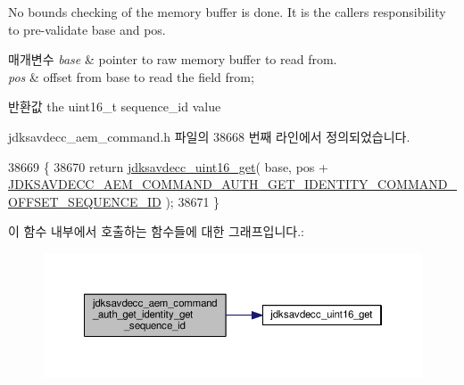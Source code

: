 No bounds checking of the memory buffer is done. It is the caller\textquotesingle{}s responsibility to pre-\/validate base and pos.


\begin{DoxyParams}{매개변수}
{\em base} & pointer to raw memory buffer to read from. \\
\hline
{\em pos} & offset from base to read the field from; \\
\hline
\end{DoxyParams}
\begin{DoxyReturn}{반환값}
the uint16\+\_\+t sequence\+\_\+id value 
\end{DoxyReturn}


jdksavdecc\+\_\+aem\+\_\+command.\+h 파일의 38668 번째 라인에서 정의되었습니다.


\begin{DoxyCode}
38669 \{
38670     \textcolor{keywordflow}{return} \hyperlink{group__endian_ga3fbbbc20be954aa61e039872965b0dc9}{jdksavdecc\_uint16\_get}( base, pos + 
      \hyperlink{group__command__auth__get__identity_gaadde34827077806c428cf6ead34ceae6}{JDKSAVDECC\_AEM\_COMMAND\_AUTH\_GET\_IDENTITY\_COMMAND\_OFFSET\_SEQUENCE\_ID}
       );
38671 \}
\end{DoxyCode}


이 함수 내부에서 호출하는 함수들에 대한 그래프입니다.\+:
\nopagebreak
\begin{figure}[H]
\begin{center}
\leavevmode
\includegraphics[width=350pt]{group__command__auth__get__identity_gae3df0c0ff13e69ca091b8459a051238b_cgraph}
\end{center}
\end{figure}



